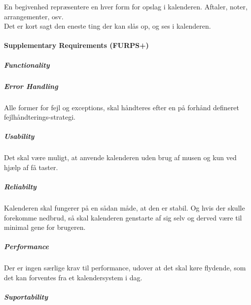 \documentclass{article}
\begin{document}
En begivenhed repræsentere en hver form for opslag i kalenderen. Aftaler, noter, arrangementer, osv. \\
Det er kort sagt den eneste ting der kan slås op, og ses i kalenderen.


   
   \paragraph{Supplementary Requirements (FURPS+)} \mbox{}
   \subparagraph{Functionality} \mbox{}
   
   \subparagraph{Error Handling} \mbox{}
   
   Alle former for fejl og exceptions, skal håndteres efter en på forhånd defineret fejlhåndterings-strategi.
   \subparagraph{Usability} \mbox{}
   
   Det skal være muligt, at anvende kalenderen uden brug af musen og kun ved hjælp af få taster.
   \subparagraph{Reliabilty} \mbox{}
   
   Kalenderen skal fungerer på en sådan måde, at den er stabil. Og hvis der skulle forekomme nedbrud, så skal kalenderen genstarte af sig selv og derved være til minimal gene for brugeren.
   \subparagraph{Performance} \mbox{}
   
   Der er ingen særlige krav til performance, udover at det skal køre flydende, som det kan forventes fra et kalendersystem i dag.
   \subparagraph{Suportability} \mbox{}
   
   
   
   
  
\end{document}
